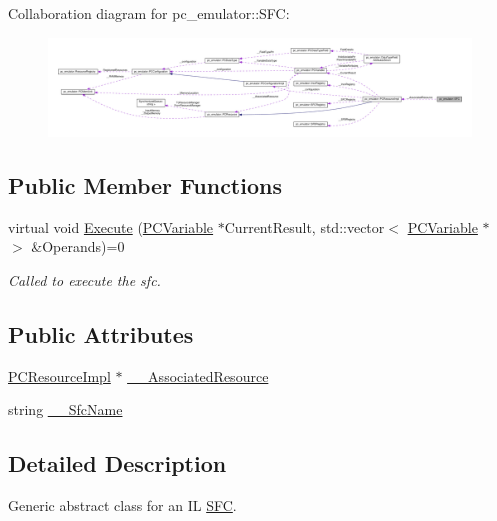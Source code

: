 Collaboration diagram for pc\+\_\+emulator\+:\+:S\+FC\+:\nopagebreak
\begin{figure}[H]
\begin{center}
\leavevmode
\includegraphics[width=350pt]{classpc__emulator_1_1SFC__coll__graph}
\end{center}
\end{figure}
\subsection*{Public Member Functions}
\begin{DoxyCompactItemize}
\item 
virtual void \hyperlink{classpc__emulator_1_1SFC_ab206c80fc0e429c56672b4f6a0ca8635}{Execute} (\hyperlink{classpc__emulator_1_1PCVariable}{P\+C\+Variable} $\ast$Current\+Result, std\+::vector$<$ \hyperlink{classpc__emulator_1_1PCVariable}{P\+C\+Variable} $\ast$ $>$ \&Operands)=0
\begin{DoxyCompactList}\small\item\em Called to execute the sfc. \end{DoxyCompactList}\end{DoxyCompactItemize}
\subsection*{Public Attributes}
\begin{DoxyCompactItemize}
\item 
\hyperlink{classpc__emulator_1_1PCResourceImpl}{P\+C\+Resource\+Impl} $\ast$ \hyperlink{classpc__emulator_1_1SFC_ae1021fef00752f06a7c6e6641b3e913c}{\+\_\+\+\_\+\+Associated\+Resource}
\item 
string \hyperlink{classpc__emulator_1_1SFC_a7b295e456008cbf12323a2880220b33e}{\+\_\+\+\_\+\+Sfc\+Name}
\end{DoxyCompactItemize}


\subsection{Detailed Description}
Generic abstract class for an IL \hyperlink{classpc__emulator_1_1SFC}{S\+FC}. 

